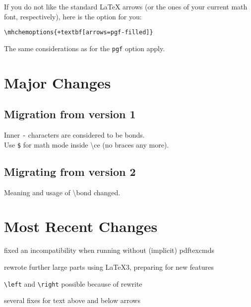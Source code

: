 \documentclass[a4paper,notitlepage]{scrreprt}
\newcommand\macro[1]{{\ttfamily\textbackslash#1}}
\begin{document}
If you do not like the standard LaTeX arrows (or the ones of your current math font, respectively), here is the option for you:

\begin{Verbatim}[commandchars=+\[\]]
  \mhchemoptions{+textbf[arrows=pgf-filled]}
\end{Verbatim}

\noindent
The same considerations as for the \verb|pgf| option apply.

\medskip
\begin{SideBySideExample}[xrightmargin=5cm]
\end{SideBySideExample}


\clearpage
\section{Major Changes}
\label{sec:WhatSNew}

\subsection{Migration from version 1}

Inner \verb|-| characters are considered to be bonds.\\
Use \verb|$| for math mode inside \macro{ce} (no braces any more).

\subsection{Migrating from version 2}

Meaning and usage of \macro{bond} changed.


\section{Most Recent Changes}%

\begin{compactitem}
\item fixed an incompatibility when running without (implicit) pdftexcmds
\end{compactitem}

\begin{compactitem}
\item rewrote further large parts using \LaTeX3, preparing for new features
\item \verb|\left| and \verb|\right| possible because of rewrite
\item several fixes for text above and below arrows
\end{compactitem}
\end{document}
